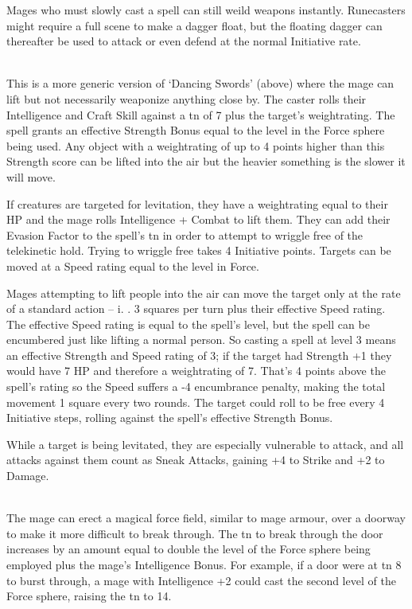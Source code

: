 \begin{multicols}{2}
Mages who must slowly cast a spell can still weild weapons instantly.  Runecasters might require a full scene to make a dagger float, but the floating dagger can thereafter be used to attack or even defend at the normal Initiative rate.

\\
This is a more generic version of `Dancing Swords' (above) where the mage can lift but not necessarily weaponize anything close by.
The caster rolls their Intelligence and Craft Skill against a \gls{tn} of 7 plus the target's \gls{weightrating}.
The spell grants an effective Strength Bonus equal to the level in the Force sphere being used.
Any object with a \gls{weightrating} of up to 4 points higher than this Strength score can be lifted into the air but the heavier something is the slower it will move.

If creatures are targeted for levitation, they have a \gls{weightrating} equal to their HP and the mage rolls Intelligence + Combat to lift them.
They can add their Evasion Factor to the spell's \gls{tn} in order to attempt to wriggle free of the telekinetic hold.
Trying to wriggle free takes 4 Initiative points.
Targets can be moved at a Speed rating equal to the level in Force.

Mages attempting to lift people into the air can move the target only at the rate of a standard action -- i.
. 3 squares per turn plus their effective Speed rating.
The effective Speed rating is equal to the spell's level, but the spell can be encumbered just like lifting a normal person.
So casting a spell at level 3 means an effective Strength and Speed rating of 3; if the target had Strength +1 they would have 7 HP and therefore a \gls{weightrating} of 7.
That's 4 points above the spell's rating so the Speed suffers a -4 encumbrance penalty, making the total movement 1 square every two \glspl{round}.
The target could roll to be free every 4 Initiative steps, rolling against the spell's effective Strength Bonus.

While a target is being levitated, they are especially vulnerable to attack, and all attacks against them count as Sneak Attacks, gaining +4 to Strike and +2 to Damage.

\\
The mage can erect a magical force field, similar to mage armour, over a doorway to make it more difficult to break through.
The \gls{tn} to break through the door increases by an amount equal to double the level of the Force sphere being employed plus the mage's Intelligence Bonus.
For example, if a door were at \gls{tn} 8 to burst through, a mage with Intelligence +2 could cast the second level of the Force sphere, raising the \gls{tn} to 14.


\end{multicols}
